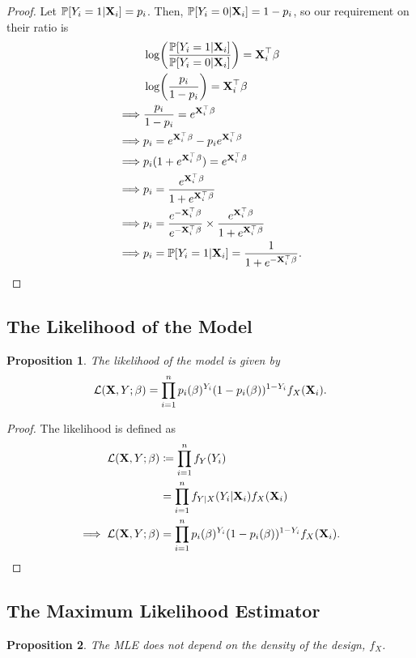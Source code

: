 \documentclass[letterpaper, reqno]{amsart}
\newtheorem{prop}{Proposition}[section]
\numberwithin{equation}{section}
\newcommand{\T}{\top} %
\newcommand{\vect}[1]{\boldsymbol{\mathbf{#1}}} %
\newcommand{\ddfrac}[2]{\frac{\displaystyle #1}{\displaystyle #2}}
\newcommand{\Prob}[1]{\mathbb{P}\mleft[#1\mright]}
\newcommand{\Li}[1]{\mathcal{L}\mleft( #1 \mright)}  %
\newcommand{\Xv}{\vect{X}}
\newcommand{\Bv}{\beta}
\begin{document}
\begin{proof}
  Let $\Prob{Y_i = 1 | \Xv_i} = p_i$. Then, $\Prob{Y_i = 0 | \Xv_i} = 1 - p_i$,
  so our requirement on their ratio is
  \begin{align*}
    &\log \mleft(\ddfrac{\Prob{Y_i = 1 | \Xv_i}}{\Prob{Y_i = 0 | \Xv_i}} \mright) = \Xv_i^\T \Bv \\
    &\log \mleft(\frac{p_i}{1 - p_i}\mright) = \Xv_i^\T \Bv \\
    \implies& \frac{p_i}{1 - p_i} = e^{\Xv_i^\T \Bv} \\
    \implies& p_i = e^{\Xv_i^\T \Bv} - p_i e^{\Xv_i^\T \Bv} \\
    \implies& p_i (1 + e^{\Xv_i^\T \Bv}) = e^{\Xv_i^\T \Bv} \\
    \implies& p_i = \frac{e^{\Xv_i^\T \Bv}}{1 + e^{\Xv_i^\T \Bv}} \\
    \implies& p_i = \frac{e^{-\Xv_i^\T \Bv}}{e^{-\Xv_i^\T \Bv}} \times \frac{e^{\Xv_i^\T \Bv}}{1 + e^{\Xv_i^\T \Bv}} \\
    \implies& p_i = \Prob{Y_i = 1 | \Xv_i} = \frac{1}{1 + e^{-\Xv_i^\T \Bv}}. \qedhere
  \end{align*}
\end{proof}

\subsection{The Likelihood of the Model}
\begin{prop}
  The likelihood of the model is given by
  \[ \Li{\Xv, Y; \Bv} = \prod_{i=1}^n p_i(\Bv)^{Y_i} (1 - p_i(\Bv))^{1 - Y_i} f_X(\Xv_i). \]
\end{prop}

\begin{proof}
  The likelihood is defined as
  \begin{align*}
    \Li{\Xv, Y; \Bv} &\coloneqq \prod_{i=1}^n f_Y(Y_i) \\
                     &= \prod_{i=1}^n f_{Y|X}(Y_i | \Xv_i) f_X(\Xv_i) \\
    \implies \Li{\Xv, Y; \Bv} &= \prod_{i=1}^n p_i(\Bv)^{Y_i} (1 - p_i(\Bv))^{1 - Y_i} f_X(\Xv_i). \qedhere
  \end{align*}
\end{proof}

\subsection{The Maximum Likelihood Estimator}
\begin{prop}
  The MLE does not depend on the density of the design, $f_X$.
\end{prop}
\end{document}
